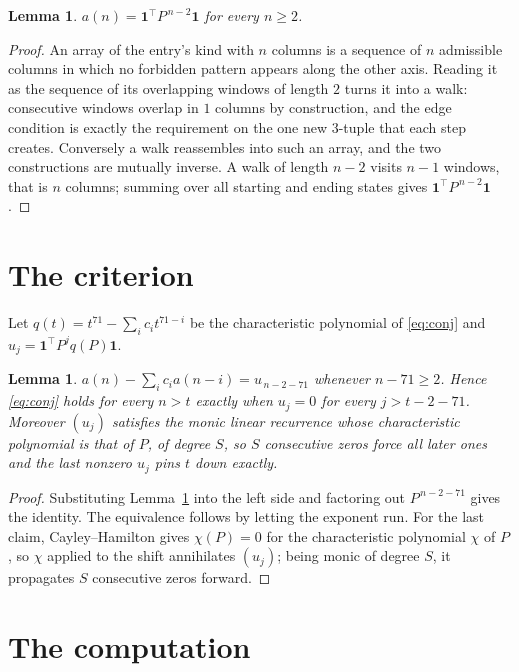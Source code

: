\documentclass[11pt,a4paper]{article}
\theoremstyle{plain}
\newtheorem{lemma}[theorem]{Lemma}
\theoremstyle{definition}
\begin{document}
\begin{lemma}\label{lem:walk}
$a(n)=\mathbf{1}^{\!\top}P^{\,n-2}\mathbf{1}$ for every $n\ge2$.
\end{lemma}

\begin{proof}
An array of the entry's kind with $n$ columns is a sequence of $n$ admissible columns in
which no forbidden pattern appears along the other axis. Reading it as the sequence of its
overlapping windows of length $2$ turns it into a walk: consecutive windows overlap in
$1$ columns by construction, and the edge condition is exactly the requirement on the one
new $3$-tuple that each step creates. Conversely a walk reassembles into such an array,
and the two constructions are mutually inverse. A walk of length $n-2$ visits $n-1$
windows, that is $n$ columns; summing over all starting and ending states gives
$\mathbf{1}^{\!\top}P^{\,n-2}\mathbf{1}$.
\end{proof}

\section{The criterion}

Let $q(t)=t^{71}-\sum_i c_i t^{71-i}$ be the characteristic polynomial of
\eqref{eq:conj} and $u_j=\mathbf{1}^{\!\top}P^{j}q(P)\mathbf{1}$.

\begin{lemma}\label{lem:crit}
$a(n)-\sum_i c_i a(n-i)=u_{\,n-2-71}$ whenever $n-71\ge2$. Hence
\eqref{eq:conj} holds for every $n>t$ exactly when $u_j=0$ for every
$j>t-2-71$. Moreover $(u_j)$ satisfies the monic linear recurrence whose
characteristic polynomial is that of $P$, of degree $S$, so $S$ consecutive zeros force all
later ones and the last nonzero $u_j$ pins $t$ down exactly.
\end{lemma}

\begin{proof}
Substituting Lemma~\ref{lem:walk} into the left side and factoring out
$P^{\,n-2-71}$ gives the identity. The equivalence follows by letting the exponent
run. For the last claim, Cayley--Hamilton gives $\chi(P)=0$ for the characteristic
polynomial $\chi$ of $P$, so $\chi$ applied to the shift annihilates $(u_j)$; being monic of
degree $S$, it propagates $S$ consecutive zeros forward.
\end{proof}

\section{The computation}
\end{document}
